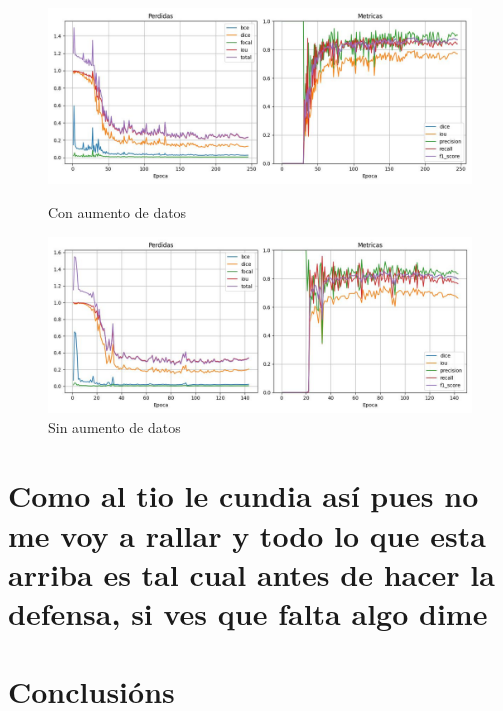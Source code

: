 \documentclass{article}
\begin{document}
\begin{itemize}
\begin{figure}[htbp]
    \centering
    \begin{minipage}{0.45\textwidth}
    \centering
        \includegraphics[width=\linewidth]{figuras/ADT.jpg}
        \caption*{Con aumento de datos}
    \end{minipage}
    \hfill
    \begin{minipage}{0.45\textwidth}
    \centering
        \includegraphics[width=\linewidth]{figuras/ADF.jpg}
        \caption*{Sin aumento de datos}
    \end{minipage}
\end{figure}

\end{itemize}

\section*{Como al tio le cundia así pues no me voy a rallar y todo lo que esta arriba es tal cual antes de hacer la defensa, si ves que falta algo dime}

\section{Conclusións}
\end{document}
